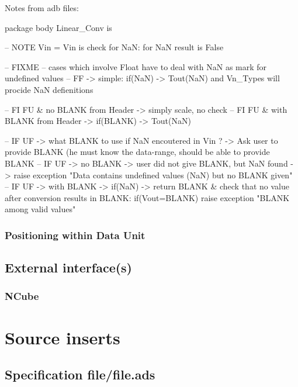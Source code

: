 \documentclass[a4paper,10pt]{article}
\begin{document}
Notes from adb files:

package body Linear\_Conv is

-- NOTE Vin = Vin is check for NaN: for NaN result is False

-- FIXME
    -- cases which involve Float have to deal with NaN as mark for undefined values
    -- FF -> simple: if(NaN) -> Tout(NaN) and Vn\_Types will procide NaN defienitions

    -- FI FU \& no   BLANK from Header -> simply scale, no check
    -- FI FU \& with BLANK from Header -> if(BLANK) -> Tout(NaN)

    -- IF UF -> what BLANK to use if NaN encoutered in Vin ? -> Ask user to provide BLANK (he must know the data-range, should be able to provide BLANK
    -- IF UF -> no   BLANK -> user did not give BLANK, but NaN found -> raise exception "Data contains undefined values (NaN) but no BLANK given"
    -- IF UF -> with BLANK -> if(NaN) -> return BLANK \& check that no value after conversion results in BLANK: if(Vout=BLANK) raise exception "BLANK among valid values"





\subsubsection{Positioning within Data Unit}




\subsection{External interface(s)}
\subsubsection{NCube}







\section{Source inserts}


\subsection{Specification file/file.ads}
\inputminted[linenos, fontsize=\footnotesize]{ada}{../lib/src/file/file.ads}
\end{document}
